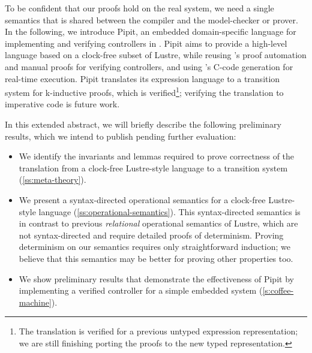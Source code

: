 \documentclass[sigplan,screen]{acmart}
\begin{document}
To be confident that our proofs hold on the real system, we need a single semantics that is shared between the compiler and the model-checker or prover.
In the following, we introduce Pipit, an embedded domain-specific language for implementing and verifying controllers in \fstar{}.
Pipit aims to provide a high-level language based on a clock-free subset of Lustre, while reusing \fstar{}'s proof automation and manual proofs for verifying controllers, and using \lowstar{}'s C-code generation for real-time execution.
Pipit translates its expression language to a transition system for k-inductive proofs, which is verified\footnote{The translation is verified for a previous untyped expression representation; we are still finishing porting the proofs to the new typed representation.}; verifying the translation to imperative code is future work.

In this extended abstract, we will briefly describe the following preliminary results, which we intend to publish pending further evaluation:
\begin{itemize}
  \item We identify the invariants and lemmas required to prove correctness of the translation from a clock-free Lustre-style language to a transition system (\autoref{ss:meta-theory}).
  \item We present a syntax-directed operational semantics for a clock-free Lustre-style language (\autoref{ss:operational-semantics}).
    This syntax-directed semantics is in contrast to previous \emph{relational} operational semantics of Lustre, which are not syntax-directed and require detailed proofs of determinism.
    Proving determinism on our semantics requires only straightforward induction; we believe that this semantics may be better for proving other properties too.
  \item We show preliminary results that demonstrate the effectiveness of Pipit by implementing a verified controller for a simple embedded system (\autoref{s:coffee-machine}).
\end{itemize}


\end{document}

